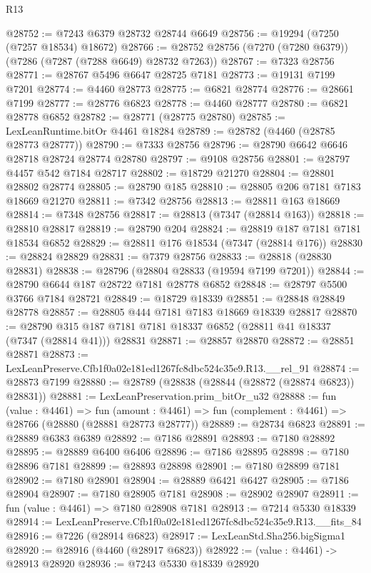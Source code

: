 \begin{lexlean}{R13}
\begin{coremodule}
@28752 := @7243 @6379 @28732 @28744 @6649
@28756 := @19294 (@7250 (@7257 @18534) @18672)
@28766 := @28752 @28756 (@7270 (@7280 @6379)) (@7286 (@7287 (@7288 @6649) @28732 @7263))
@28767 := @7323 @28756
@28771 := @28767 @5496 @6647 @28725 @7181
@28773 := @19131 @7199 @7201
@28774 := @4460 @28773
@28775 := @6821 @28774
@28776 := @28661 @7199
@28777 := @28776 @6823
@28778 := @4460 @28777
@28780 := @6821 @28778 @6852
@28782 := @28771 (@28775 @28780)
@28785 := LexLeanRuntime.bitOr @4461 @18284
@28789 := @28782 (@4460 (@28785 @28773 @28777))
@28790 := @7333 @28756
@28796 := @28790 @6642 @6646 @28718 @28724 @28774 @28780
@28797 := @9108 @28756
@28801 := @28797 @4457 @542 @7184 @28717
@28802 := @18729 @21270
@28804 := @28801 @28802 @28774
@28805 := @28790 @185
@28810 := @28805 @206 @7181 @7183 @18669 @21270
@28811 := @7342 @28756
@28813 := @28811 @163 @18669
@28814 := @7348 @28756
@28817 := @28813 (@7347 (@28814 @163))
@28818 := @28810 @28817
@28819 := @28790 @204
@28824 := @28819 @187 @7181 @7181 @18534 @6852
@28829 := @28811 @176 @18534 (@7347 (@28814 @176))
@28830 := @28824 @28829
@28831 := @7379 @28756
@28833 := @28818 (@28830 @28831)
@28838 := @28796 (@28804 @28833 (@19594 @7199 @7201))
@28844 := @28790 @6644 @187 @28722 @7181 @28778 @6852
@28848 := @28797 @5500 @3766 @7184 @28721
@28849 := @18729 @18339
@28851 := @28848 @28849 @28778
@28857 := @28805 @444 @7181 @7183 @18669 @18339 @28817
@28870 := @28790 @315 @187 @7181 @7181 @18337 @6852 (@28811 @41 @18337 (@7347 (@28814 @41))) @28831
@28871 := @28857 @28870
@28872 := @28851 @28871
@28873 := LexLeanPreserve.Cfb1f0a02e181ed1267fc8dbc524c35e9.R13.__rel_91
@28874 := @28873 @7199
@28880 := @28789 (@28838 (@28844 (@28872 (@28874 @6823)) @28831))
@28881 := LexLeanPreservation.prim_bitOr_u32
@28888 := fun (value : @4461) =>
  fun (amount : @4461) => fun (complement : @4461) => @28766 (@28880 (@28881 @28773 @28777))
@28889 := @28734 @6823
@28891 := @28889 @6383 @6389
@28892 := @7186 @28891
@28893 := @7180 @28892
@28895 := @28889 @6400 @6406
@28896 := @7186 @28895
@28898 := @7180 @28896 @7181
@28899 := @28893 @28898
@28901 := @7180 @28899 @7181
@28902 := @7180 @28901
@28904 := @28889 @6421 @6427
@28905 := @7186 @28904
@28907 := @7180 @28905 @7181
@28908 := @28902 @28907
@28911 := fun (value : @4461) => @7180 @28908 @7181
@28913 := @7214 @5330 @18339
@28914 := LexLeanPreserve.Cfb1f0a02e181ed1267fc8dbc524c35e9.R13.__fits_84
@28916 := @7226 (@28914 @6823)
@28917 := LexLeanStd.Sha256.bigSigma1
@28920 := @28916 (@4460 (@28917 @6823))
@28922 := (value : @4461) -> @28913 @28920
@28936 := @7243
    @5330
    @18339
    @28920

\end{coremodule}
\end{lexlean}
